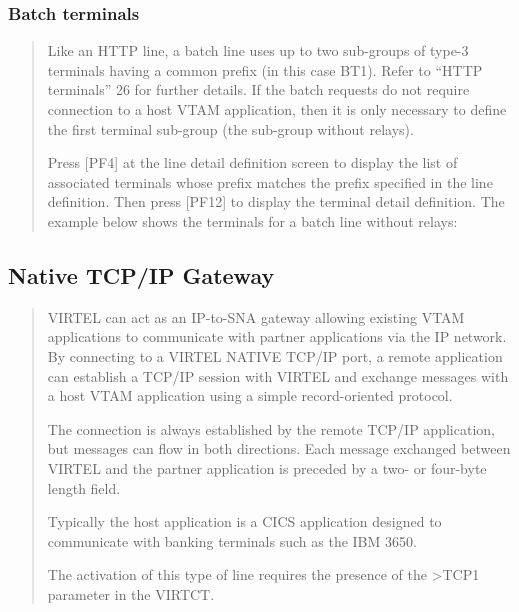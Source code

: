 \documentclass[letterpaper,10pt,english]{sphinxmanual}
\begin{document}
\subsubsection{Batch terminals}
\label{\detokenize{connectivity_guide:batch-terminals}}\begin{quote}

Like an HTTP line, a batch line uses up to two sub-groups of type-3 terminals having a common prefix (in this case BT1). Refer to “HTTP terminals” 26 for further details. If the batch requests do not require connection to a host VTAM application, then it is only necessary to define the first terminal sub-group (the sub-group without relays).

Press {[}PF4{]} at the line detail definition screen to display the list of associated terminals whose prefix matches the prefix specified in the line definition. Then press {[}PF12{]} to display the terminal detail definition. The example below shows the terminals for a batch line without relays:
\end{quote}




\subsection{Native TCP/IP Gateway}
\label{\detokenize{connectivity_guide:native-tcp-ip-gateway}}\begin{quote}

VIRTEL can act as an IP-to-SNA gateway allowing existing VTAM applications to communicate with partner applications via the IP network. By connecting to a VIRTEL NATIVE TCP/IP port, a remote application can establish a TCP/IP session with VIRTEL and exchange messages with a host VTAM application using a simple record-oriented protocol.

The connection is always established by the remote TCP/IP application, but messages can flow in both directions. Each message  exchanged between VIRTEL and the partner application is preceded by a two- or four-byte length field.

Typically the host application is a CICS application designed to communicate with banking terminals such as the IBM 3650.

The activation of this type of line requires the presence of the \textgreater{}TCP1 parameter in the VIRTCT.
\end{quote}
\end{document}
